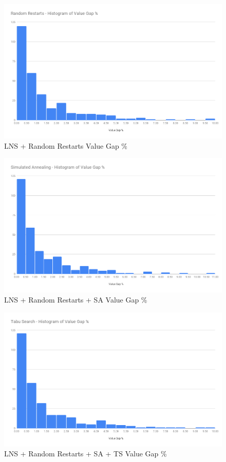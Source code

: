 \begin{figure}[!htbp]
    \centering
    \includegraphics[width=\textwidth]{Figures/Metaheuristics/restarts_value_gap.png}
    \caption{LNS + Random Restarts Value Gap \%}
    \label{fig:value_gap_perc_restarts}
\end{figure}

\begin{figure}[!htbp]
    \centering
    \includegraphics[width=\textwidth]{Figures/Metaheuristics/annealing_value_gap.png}
    \caption{LNS + Random Restarts + SA Value Gap \%}
    \label{fig:value_gap_perc_annealing}
\end{figure}

\begin{figure}[!htbp]
    \centering
    \includegraphics[width=\textwidth]{Figures/Metaheuristics/tabu_value_gap.png}
    \caption{LNS + Random Restarts + SA + TS Value Gap \%}
    \label{fig:value_gap_perc_tabu}
\end{figure}

